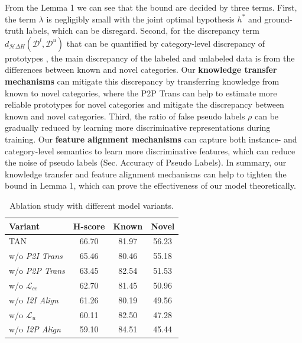 \documentclass[letterpaper]{article} %
\begin{document}
From the Lemma 1 we can see that the bound are decided by three terms. First, the term $\lambda$ is negligibly small with the joint optimal hypothesis $h^*$ and ground-truth labels, which can be disregard. Second, for the discrepancy term $d_{\mathcal{H}\Delta{H}}(\mathcal{D}^l,\mathcal{D}^u)$ that can be quantified by category-level discrepancy of prototypes \citep{proto3}, the main discrepancy of the labeled and unlabeled data is from the differences between known and novel categories.
Our \textbf{knowledge transfer mechanisms} can mitigate this discrepancy by transferring knowledge from known to novel categories, where the P2P Trans can help to estimate more reliable prototypes for novel categories and mitigate the discrepancy between known and novel categories. Third, the ratio of false pseudo labels $\rho$ can be gradually reduced by learning more discriminative representations during training. Our \textbf{feature alignment mechanisms} can capture both instance- and category-level semantics to learn more discriminative features, which can reduce the noise of pseudo labels (Sec. Accuracy of Pseudo Labels). In summary, our knowledge transfer and feature alignment mechanisms can help to tighten the bound in Lemma 1, which can prove the effectiveness of our model theoretically.



\begin{table}
\setlength\tabcolsep{10pt}
\centering
\begin{tabular}{lccc}
\toprule
Variant & H-score & Known & Novel \\
\midrule  
TAN & 66.70 & 81.97 & 56.23\\
\midrule
w/o \textit{P2I Trans}    & 65.46 & 80.46 & 55.18 \\
w/o \textit{P2P Trans}    & 63.45 & 82.54 & 51.53 \\
w/o $\mathcal{L}_{ce}$    & 62.70 & 81.45 & 50.96 \\
w/o \textit{I2I Align}    & 61.26 & 80.19 & 49.56 \\
w/o $\mathcal{L}_{u}$     & 60.11 & 82.50 & 47.28 \\
w/o \textit{I2P Align}    & 59.10 & 84.51 & 45.44 \\
\bottomrule

\end{tabular}
\caption{Ablation study with different model variants.}
\label{table2}
\end{table}
\end{document}
